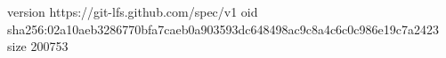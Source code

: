 version https://git-lfs.github.com/spec/v1
oid sha256:02a10aeb3286770bfa7caeb0a903593dc648498ac9c8a4c6c0c986e19c7a2423
size 200753
